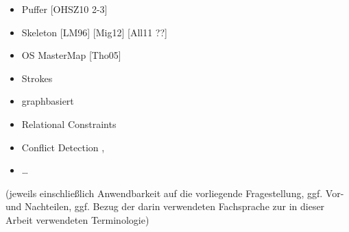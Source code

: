 \documentclass{../thesis}
\begin{document}
\begin{itemize}

	\item Puffer [OHSZ10 2-3]

	\item Skeleton [LM96] [Mig12] [All11 ??]


	\item OS MasterMap
	[Tho05]

	\item Strokes \cite{Tho06b, EM00}

	\item graphbasiert \cite{JC04, MM99, HAS05, TR95, Kne09}

	\item Relational Constraints \cite{TBDJRG12}

	\item Conflict Detection \cite{KP98}, \cite{Tho06a}

	\item …

\end{itemize}


(jeweils einschließlich Anwendbarkeit auf die vorliegende Fragestellung, ggf. Vor- und Nachteilen, ggf. Bezug der darin verwendeten Fachsprache zur in dieser Arbeit verwendeten Terminologie)


%
\end{document}
